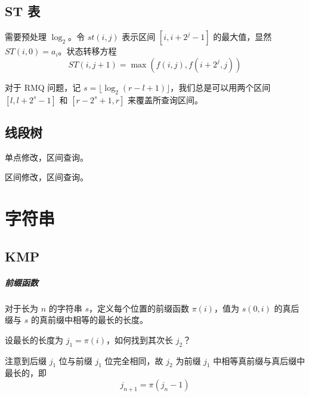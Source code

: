 \documentclass{probook}
\begin{document}
\begin{multicols}{2}
\section{ST 表}

需要预处理 $\log_2$。令 $st(i,j)$ 表示区间 $[i,i+2^j-1]$ 的最大值，显然 $ST(i,0)=a_i$。状态转移方程
$$ST(i,j+1) = \max(f(i,j) , f(i+2^{j},j))$$



对于 RMQ 问题，记 $s = \lfloor\log_2(r-l+1)\rfloor$，我们总是可以用两个区间 $[l,l+2^s-1]$ 和 $[r-2^s+1,r]$ 来覆盖所查询区间。



\section{线段树}

单点修改，区间查询。



区间修改，区间查询。









\chapter{字符串}

\section{KMP}

\paragraph{前缀函数}

对于长为 $n$ 的字符串 $s$，定义每个位置的前缀函数 $\pi(i)$，值为 $s(0,i)$ 的真后缀与 $s$ 的真前缀中相等的最长的长度。

设最长的长度为 $j_1=\pi(i)$，如何找到其次长 $j_2$？

注意到后缀 $j_1$ 位与前缀 $j_1$ 位完全相同，故 $j_2$ 为前缀 $j_1$ 中相等真前缀与真后缀中最长的，即
\[j_{n+1} = \pi(j_n-1)\]


\end{multicols}
\end{document}

